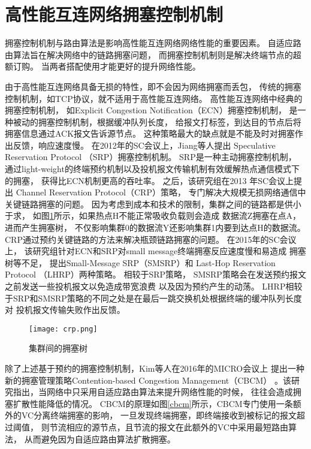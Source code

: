 \section{高性能互连网络拥塞控制机制}
拥塞控制机制与路由算法是影响高性能互连网络网络性能的重要因素。
自适应路由算法旨在解决网络中的链路拥塞问题，
而拥塞控制机制则是解决终端节点的超额订购。
当两者搭配使用才能更好的提升网络性能。

由于高性能互连网络具备无损的特性，即不会因为网络拥塞而丢包，
传统的拥塞控制机制，如TCP协议，就不适用于高性能互连网络。
高性能互连网络中经典的拥塞控制机制，
如Explicit Congestion Notification（ECN）拥塞控制机制，
是一种被动的拥塞控制机制，根据缓冲队列长度，
给报文打标签，到达目的节点后将拥塞信息通过ACK报文告诉源节点。
这种策略最大的缺点就是不能及时对拥塞作出反馈，响应速度慢。
在2012年的SC会议上，Jiang等人提出
Speculative Reservation Protocol （SRP）拥塞控制机制。
SRP是一种主动拥塞控制机制，
通过light-weight的终端预约机制以及投机报文传输机制有效缓解热点通信模式下的拥塞，
获得比ECN机制更高的吞吐率。
之后，该研究组在2013 年SC会议上提出
Channel Reservation Protocol（CRP）策略，
专门解决大规模无损网络通信中关键链路拥塞的问题。
因为考虑到成本和技术的限制，集群之间的链路都是供小于求，
如图\ref{crp}所示，如果热点H不能正常吸收负载则会造成
数据流Z拥塞在点A，进而产生拥塞树，
不仅影响集群0的数据流Y还影响集群1内要到达点H的数据流。
CRP通过预约关键链路的方法来解决瓶颈链路拥塞的问题。
在2015年的SC会议上，
该研究组针对ECN和SRP对small message终端拥塞反应速度慢和易造成
拥塞树等不足，
提出Small-Message SRP（SMSRP）和
Last-Hop Reservation Protocol （LHRP）两种策略。
相较于SRP策略，
SMSRP策略会在发送预约报文之前发送一些投机报文以免造成带宽浪费
以及因为预约产生的动荡。
LHRP相较于SRP和SMSRP策略的不同之处是在最后一跳交换机处根据终端的缓冲队列长度对
投机报文传输失败作出反馈。

\begin{figure}[htp]
  \centering
    \texttt{[image: crp.png]}
    \caption{集群间的拥塞树}
       \label{crp}
\end{figure}

除了上述基于预约的拥塞控制机制，Kim等人在2016年的MICRO会议上
提出一种新的拥塞管理策略Contention-based Congestion Management（CBCM）
。该研究指出，当网络中只采用自适应路由算法来提升网络性能的时候，
往往会造成拥塞扩散性能降低的情况。
CBCM的原理如图\ref{cbcm}所示，CBCM专门使用一条额外的VC分离终端拥塞的影响，
一旦发现终端拥塞，即终端接收到被标记的报文超过阈值，
则节流相应的源节点，且节流的报文在此额外的VC中采用最短路由算法，
从而避免因为自适应路由算法扩散拥塞。

